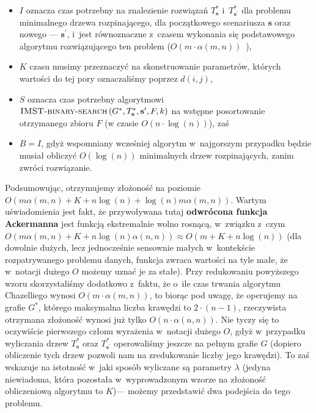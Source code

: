 \begin{itemize}
	\item $I$ oznacza czas potrzebny na znalezienie rozwiązań $T^{\ast}_{\textbf{s}}$ i~$T^{\ast}_{\textbf{s}^{\prime}}$ dla problemu minimalnego drzewa rozpinającego, dla początkowego scenariusza $\textbf{s}$ oraz nowego --- $\textbf{s}^{\prime}$, i~jest równoznaczne z~czasem wykonania się podstawowego algorytmu rozwiązującego ten problem ($O \left( m \cdot \alpha \left( m, n \right) \right)$~\cite{Chazelle:2000:MST:355541.355562}),
	\item $K$ czasu musimy przeznaczyć na skonstruowanie parametrów, których wartości do tej pory oznaczaliśmy poprzez $d \left( i, j \right)$,
	\item $S$ oznacza czas potrzebny algorytmowi $\textsc{IMST-binary-search} \left( G^{\ast}, T^{\ast}_{\textbf{s}}, \textbf{s}^{\prime}, F, k \right)$ na wstępne posortowanie otrzymanego zbioru $F$ (w czasie $O \left( n \cdot \log \left( n \right) \right)$), zaś
	\item $B = I$, gdyż wspomniany wcześniej algorytm w~najgorszym przypadku będzie musiał obliczyć $O \left( \log \left( n \right) \right)$ minimalnych drzew rozpinających, zanim zwróci rozwiązanie.
\end{itemize}

Podsumowując, otrzymujemy złożoność na poziomie $O \left( m \alpha \left( m, n \right) + K + n \log \left( n \right) + \log \left( n \right) m \alpha \left( m, n \right) \right)$. Wartym uświadomienia jest fakt, że przywoływana tutaj \textbf{odwrócona funkcja Ackermanna} jest funkcją ekstremalnie wolno rosnącą, w~związku z~czym $O \left( m \alpha \left( m, n \right) + K + n \log \left( n \right) \alpha \left( n, n \right) \right) \approx O \left( m + K + n \log \left( n \right) \right)$ (dla dowolnie dużych, lecz jednocześnie sensownie małych w~kontekście rozpatrywanego problemu danych, funkcja zwraca wartości na tyle małe, że w~notacji dużego $O$ możemy uznać je za stałe). Przy redukowaniu powyższego wzoru skorzystaliśmy dodatkowo z~faktu, że o~ile czas trwania algorytmu Chazelliego wynosi $O \left( m \cdot \alpha \left( m, n \right) \right)$, to biorąc pod uwagę, że operujemy na grafie $G^{\ast}$, którego maksymalna liczba krawędzi to $2 \cdot \left( n - 1 \right)$, rzeczywista otrzymana złożoność wynosi już tylko $O \left( n \cdot \alpha \left( n, n \right) \right)$. Nie tyczy się to oczywiście pierwszego członu wyrażenia w~notacji dużego $O$, gdyż w~przypadku wyliczania drzew $T^{\ast}_{\textbf{s}}$ oraz $T^{\ast}_{\textbf{s}^{\prime}}$ operowaliśmy jeszcze na pełnym grafie $G$ (dopiero obliczenie tych drzew pozwoli nam na zredukowanie liczby jego krawędzi). To zaś wskazuje na istotność w~jaki sposób wyliczane są parametry $\lambda$ (jedyna niewiadoma, która pozostała w~wyprowadzonym wzorze na złożoność obliczeniową algorytmu to $K$)--- możemy przedstawić dwa podejścia do tego problemu.

